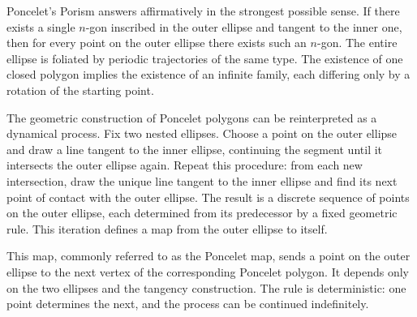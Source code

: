 Poncelet’s Porism answers affirmatively in the strongest possible sense. If there exists a single $n$-gon inscribed in the outer ellipse and tangent to the inner one, then for every point on the outer ellipse there exists such an $n$-gon. The entire ellipse is foliated by periodic trajectories of the same type. The existence of one closed polygon implies the existence of an infinite family, each differing only by a rotation of the starting point.

\begin{center}
\end{center}

The geometric construction of Poncelet polygons can be reinterpreted as a dynamical process. Fix two nested ellipses. Choose a point on the outer ellipse and draw a line tangent to the inner ellipse, continuing the segment until it intersects the outer ellipse again. Repeat this procedure: from each new intersection, draw the unique line tangent to the inner ellipse and find its next point of contact with the outer ellipse. The result is a discrete sequence of points on the outer ellipse, each determined from its predecessor by a fixed geometric rule. This iteration defines a map from the outer ellipse to itself.

This map, commonly referred to as the Poncelet map, sends a point on the outer ellipse to the next vertex of the corresponding Poncelet polygon. It depends only on the two ellipses and the tangency construction. The rule is deterministic: one point determines the next, and the process can be continued indefinitely.

